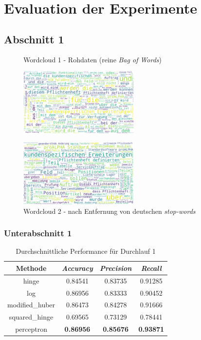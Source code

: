\chapter{Evaluation der Experimente}
\label{ch:versuche}


\section{Abschnitt 1}
\label{sec:domain-stopwords}

\begin{figure}[htbp]	
	\begin{minipage}{0.48\textwidth}
		\centering
		\caption{Wordcloud 1 - Rohdaten (reine \textit{Bag of Words})}
		\label{pic:wc-raw}
		\includegraphics[width=6cm]{img/roh.png}
	\end{minipage}
	\hfill
	\begin{minipage}{0.48\textwidth}
		\centering
		\caption{Wordcloud 2 - nach Entfernung von deutschen \textit{stop-words}}
		\label{pic:wc-stops1}
		\includegraphics[width=6cm]{img/nurstop.png}		
	\end{minipage} 	
\end{figure}

\subsection{Unterabschnitt 1}

\begin{table}[htb]
	\centering
	\begin{tabular}{|c|c|c|c|} \hline
		Methode & \textit{Accuracy} & \textit{Precision} & \textit{Recall} \\ \hline
		hinge & 0.84541 & 0.83735 & 0.91285 \\
		log & 0.86956 & 0.83333 & 0.90452 \\
		modified\_huber & 0.86473 & 0.84278 & 0.91666 \\
		squared\_hinge & 0.69565 & 0.73129 & 0.78441 \\
		perceptron & \textbf{0.86956} & \textbf{0.85676} & \textbf{0.93871} \\ \hline
	\end{tabular}
	\caption{Durchschnittliche Performance für Durchlauf 1}
	\label{tab:methods-d1}
\end{table}

